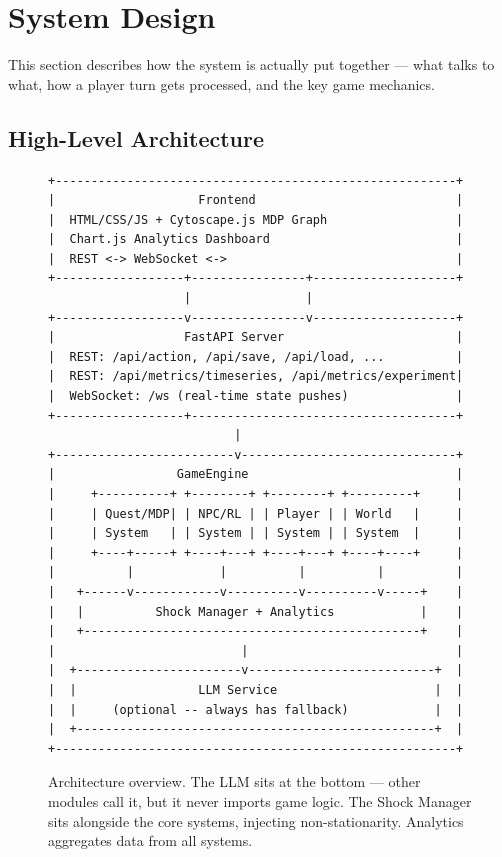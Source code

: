 \section{System Design}
\label{sec:architecture}

This section describes how the system is actually put together --- what talks to what, how a player turn gets processed, and the key game mechanics.

\subsection{High-Level Architecture}

\begin{figure}[ht]
\centering
\begin{verbatim}
+--------------------------------------------------------+
|                    Frontend                            |
|  HTML/CSS/JS + Cytoscape.js MDP Graph                  |
|  Chart.js Analytics Dashboard                          |
|  REST <-> WebSocket <->                                |
+------------------+----------------+--------------------+
                   |                |
+------------------v----------------v--------------------+
|                  FastAPI Server                        |
|  REST: /api/action, /api/save, /api/load, ...          |
|  REST: /api/metrics/timeseries, /api/metrics/experiment|
|  WebSocket: /ws (real-time state pushes)               |
+------------------+-------------------------------------+
                          |
+-------------------------v------------------------------+
|                 GameEngine                             |
|     +----------+ +--------+ +--------+ +---------+     |
|     | Quest/MDP| | NPC/RL | | Player | | World   |     |
|     | System   | | System | | System | | System  |     |
|     +----+-----+ +----+---+ +----+---+ +----+----+     |
|          |            |          |          |          |
|   +------v------------v----------v----------v-----+    |
|   |          Shock Manager + Analytics            |    |
|   +-----------------------------------------------+    |
|                          |                             |
|  +-----------------------v--------------------------+  |
|  |                 LLM Service                      |  |
|  |     (optional -- always has fallback)            |  |
|  +--------------------------------------------------+  |
+--------------------------------------------------------+
\end{verbatim}
\caption{Architecture overview. The LLM sits at the bottom --- other modules call it, but it never imports game logic. The Shock Manager sits alongside the core systems, injecting non-stationarity. Analytics aggregates data from all systems.}
\label{fig:arch}
\end{figure}

